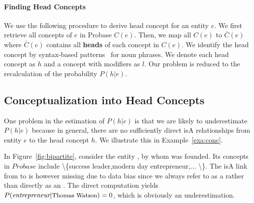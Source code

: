 \vspace{-4mm}
\paragraph*{Finding Head Concepts}
We use the following procedure to derive head concept for an entity $e$.
We first retrieve all concepts of $e$ in Probase $C(e)$.
Then, we map all $C(e)$ to $\bar{C}(e)$ where $\bar{C}(e)$ contains all {\bf heads} of each concept in $C(e)$.
We identify the head concept by syntax-based patterns~\cite{ponzetto2007deriving} for noun phrases.
We denote each head concept as $h$ and a concept with modifiers as ${l}$.
Our problem is reduced to the recalculation of the probability $P({h}|e)$.

\vspace{-4mm}
\subsection{Conceptualization into Head Concepts}
One problem in the estimation of $P(h|e)$ is that we are likely to underestimate $P(h|e)$ because in general, there are no sufficiently direct isA relationships from entity $e$ to the head concept $h$.
We illustrate this in Example~\ref{exa:conc}.





{\footnotesize
\begin{example}[Underestimation]
\label{exa:conc}
In Figure~\ref{fig:bipartite}, consider the entity , by whom  was founded. 
Its concepts in $Probase$ include \ac{\{success leader,modern day entrepreneur,... \}}. 
The isA link from  to  is however missing due to data bias since we always refer to  as a  rather than directly as an . 
The direct computation yields $P(\ac{entrepreneur}|\at{\text{Thomas Watson}})=0$, which is obviously an underestimation.
\end{example}
}


